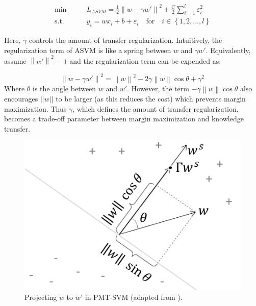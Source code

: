 \begin{equation}\label{eq:gama:asvm}
\begin{aligned}
\min \qquad& L_{ASVM} = \frac{1}{2}{\left\| w - \gamma w' \right\|^2} + \frac{C}{2}\sum\limits_{i = 1}^l {{\varepsilon_i ^2}}\\
\text{s.t.}\qquad&{y_i} = w{x_i} + b + {\varepsilon _i} \quad   \text{for} \quad i \in \left\{ {1,2,...,l} \right\}
\end{aligned}
\end{equation}

Here, $\gamma$ controls the amount of transfer regularization. Intuitively, the regularization term of ASVM is like a spring between $w$ and $\gamma w'$. Equivalently, assume ${\left\| {w'} \right\|^2}=1$ and the regularization term can be expended as:

\begin{equation*}
{\left\| {w - \gamma w'} \right\|^2} = {\left\| w \right\|^2} - 2\gamma \left\| w \right\|\cos \theta  + {\gamma ^2}
\end{equation*}
Where $\theta$ is the angle between $w$ and $w'$. However, the term $-\gamma \left\| w \right\|\cos \theta$ also encourages $||w||$
to be larger (as this reduces the cost) which prevents margin maximization. Thus $\gamma$, which defines the amount of transfer regularization, becomes a trade-off parameter between margin maximization and knowledge transfer.

\begin{figure}
	\centering
	\includegraphics[scale=.6]{transfer/fig/pmt-svm.png}
	\caption{Projecting $w$ to $w'$ in PMT-SVM (adapted from \cite{aytar2011tabula}).}\label{fig:gama:pmt}
\end{figure}

